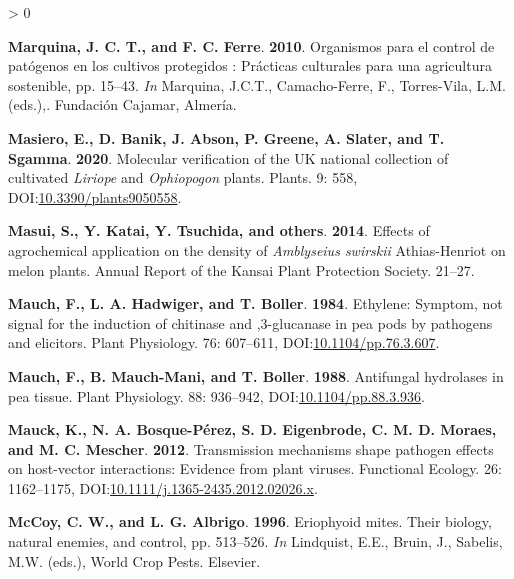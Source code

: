 \documentclass{ufdissertation}[overrideChapters] %
\newlength{\cslhangindent}
\newenvironment{CSLReferences}[2] %
 {%
  \setlength{\parindent}{0pt}
  \ifodd #1 \everypar{\setlength{\hangindent}{\cslhangindent}}\ignorespaces\fi
  \ifnum #2 > 0
  \setlength{\parskip}{#2\baselineskip}
  \fi
 }%
 {}
\begin{document}
{\begin{CSLReferences}{1}{1}
\leavevmode{}%
\textbf{Marquina, J. C. T., and F. C. Ferre}. \textbf{2010}. Organismos para el control de pat{ó}genos en los cultivos protegidos : Pr{á}cticas culturales para una agricultura sostenible, pp. 15--43. \emph{In} Marquina, J.C.T., Camacho-Ferre, F., Torres-Vila, L.M. (eds.),. Fundaci{ó}n Cajamar, Almer{í}a.

\leavevmode{}%
\textbf{Masiero, E., D. Banik, J. Abson, P. Greene, A. Slater, and T. Sgamma}. \textbf{2020}. Molecular verification of the {UK} national collection of cultivated {\emph{Liriope}} and {\emph{Ophiopogon}} plants. Plants. 9: 558, DOI:\href{https://doi.org/10.3390/plants9050558}{10.3390/plants9050558}.

\leavevmode{}%
\textbf{Masui, S., Y. Katai, Y. Tsuchida, and others}. \textbf{2014}. Effects of agrochemical application on the density of {\emph{Amblyseius swirskii}} {Athias}-{Henriot} on melon plants. Annual Report of the Kansai Plant Protection Society. 21--27.

\leavevmode{}%
\textbf{Mauch, F., L. A. Hadwiger, and T. Boller}. \textbf{1984}. Ethylene: Symptom, not signal for the induction of chitinase and ,3-glucanase in pea pods by pathogens and elicitors. Plant Physiology. 76: 607--611, DOI:\href{https://doi.org/10.1104/pp.76.3.607}{10.1104/pp.76.3.607}.

\leavevmode{}%
\textbf{Mauch, F., B. Mauch-Mani, and T. Boller}. \textbf{1988}. Antifungal hydrolases in pea tissue. Plant Physiology. 88: 936--942, DOI:\href{https://doi.org/10.1104/pp.88.3.936}{10.1104/pp.88.3.936}.

\leavevmode{}%
\textbf{Mauck, K., N. A. Bosque-Pérez, S. D. Eigenbrode, C. M. D. Moraes, and M. C. Mescher}. \textbf{2012}. Transmission mechanisms shape pathogen effects on host-vector interactions: Evidence from plant viruses. Functional Ecology. 26: 1162--1175, DOI:\href{https://doi.org/10.1111/j.1365-2435.2012.02026.x}{10.1111/j.1365-2435.2012.02026.x}.

\leavevmode{}%
\textbf{McCoy, C. W., and L. G. Albrigo}. \textbf{1996}. Eriophyoid mites. Their biology, natural enemies, and control, pp. 513--526. \emph{In} Lindquist, E.E., Bruin, J., Sabelis, M.W. (eds.), World Crop Pests. Elsevier.


\end{CSLReferences}}
\end{document}
